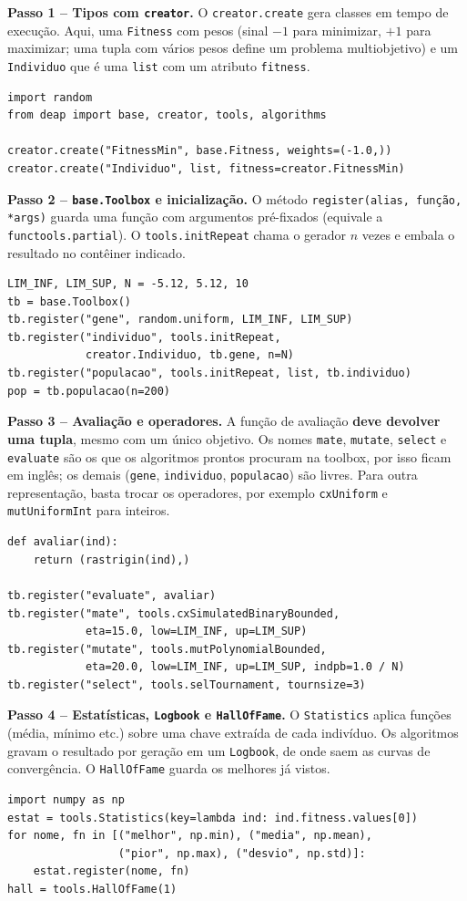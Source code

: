 \documentclass[conference]{IEEEtran}
\newcommand{\code}[1]{\texttt{#1}}
\begin{document}
\textbf{Passo 1 -- Tipos com \code{creator}.} O \code{creator.create} gera classes em tempo de execução. Aqui, uma \code{Fitness} com pesos (sinal $-1$ para minimizar, $+1$ para maximizar; uma tupla com vários pesos define um problema multiobjetivo) e um \code{Individuo} que é uma \code{list} com um atributo \code{fitness}.
\begin{lstlisting}
import random
from deap import base, creator, tools, algorithms

creator.create("FitnessMin", base.Fitness, weights=(-1.0,))
creator.create("Individuo", list, fitness=creator.FitnessMin)
\end{lstlisting}

\textbf{Passo 2 -- \code{base.Toolbox} e inicialização.} O método \code{register(alias, função, *args)} guarda uma função com argumentos pré-fixados (equivale a \code{functools.partial}). O \code{tools.initRepeat} chama o gerador $n$ vezes e embala o resultado no contêiner indicado.
\begin{lstlisting}
LIM_INF, LIM_SUP, N = -5.12, 5.12, 10
tb = base.Toolbox()
tb.register("gene", random.uniform, LIM_INF, LIM_SUP)
tb.register("individuo", tools.initRepeat,
            creator.Individuo, tb.gene, n=N)
tb.register("populacao", tools.initRepeat, list, tb.individuo)
pop = tb.populacao(n=200)
\end{lstlisting}

\textbf{Passo 3 -- Avaliação e operadores.} A função de avaliação \textbf{deve devolver uma tupla}, mesmo com um único objetivo. Os nomes \code{mate}, \code{mutate}, \code{select} e \code{evaluate} são os que os algoritmos prontos procuram na toolbox, por isso ficam em inglês; os demais (\code{gene}, \code{individuo}, \code{populacao}) são livres. Para outra representação, basta trocar os operadores, por exemplo \code{cxUniform} e \code{mutUniformInt} para inteiros.
\begin{lstlisting}
def avaliar(ind):
    return (rastrigin(ind),)

tb.register("evaluate", avaliar)
tb.register("mate", tools.cxSimulatedBinaryBounded,
            eta=15.0, low=LIM_INF, up=LIM_SUP)
tb.register("mutate", tools.mutPolynomialBounded,
            eta=20.0, low=LIM_INF, up=LIM_SUP, indpb=1.0 / N)
tb.register("select", tools.selTournament, tournsize=3)
\end{lstlisting}

\textbf{Passo 4 -- Estatísticas, \code{Logbook} e \code{HallOfFame}.} O \code{Statistics} aplica funções (média, mínimo etc.) sobre uma chave extraída de cada indivíduo. Os algoritmos gravam o resultado por geração em um \code{Logbook}, de onde saem as curvas de convergência. O \code{HallOfFame} guarda os melhores já vistos.
\begin{lstlisting}
import numpy as np
estat = tools.Statistics(key=lambda ind: ind.fitness.values[0])
for nome, fn in [("melhor", np.min), ("media", np.mean),
                 ("pior", np.max), ("desvio", np.std)]:
    estat.register(nome, fn)
hall = tools.HallOfFame(1)
\end{lstlisting}
\end{document}

